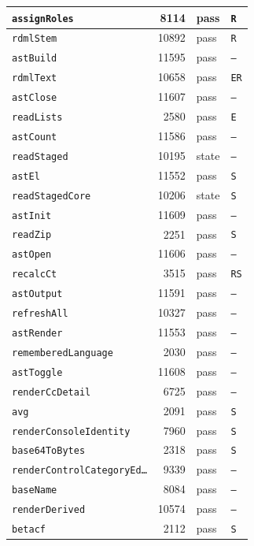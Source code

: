 {\begin{xltabular}{\linewidth}{|l|r|X|X|}
\texttt{assignRoles} & 8114 & pass & \texttt{R} \\ \hline
\texttt{rdmlStem} & 10892 & pass & \texttt{R} \\ \hline
\texttt{astBuild} & 11595 & pass & \texttt{--} \\ \hline
\texttt{rdmlText} & 10658 & pass & \texttt{ER} \\ \hline
\texttt{astClose} & 11607 & pass & \texttt{--} \\ \hline
\texttt{readLists} & 2580 & pass & \texttt{E} \\ \hline
\texttt{astCount} & 11586 & pass & \texttt{--} \\ \hline
\texttt{readStaged} & 10195 & state & \texttt{--} \\ \hline
\texttt{astEl} & 11552 & pass & \texttt{S} \\ \hline
\texttt{readStagedCore} & 10206 & state & \texttt{S} \\ \hline
\texttt{astInit} & 11609 & pass & \texttt{--} \\ \hline
\texttt{readZip} & 2251 & pass & \texttt{S} \\ \hline
\texttt{astOpen} & 11606 & pass & \texttt{--} \\ \hline
\texttt{recalcCt} & 3515 & pass & \texttt{RS} \\ \hline
\texttt{astOutput} & 11591 & pass & \texttt{--} \\ \hline
\texttt{refreshAll} & 10327 & pass & \texttt{--} \\ \hline
\texttt{astRender} & 11553 & pass & \texttt{--} \\ \hline
\texttt{rememberedLanguage} & 2030 & pass & \texttt{--} \\ \hline
\texttt{astToggle} & 11608 & pass & \texttt{--} \\ \hline
\texttt{renderCcDetail} & 6725 & pass & \texttt{--} \\ \hline
\texttt{avg} & 2091 & pass & \texttt{S} \\ \hline
\texttt{renderConsoleIdentity} & 7960 & pass & \texttt{S} \\ \hline
\texttt{base64ToBytes} & 2318 & pass & \texttt{S} \\ \hline
\texttt{renderControlCategoryEd…} & 9339 & pass & \texttt{--} \\ \hline
\texttt{baseName} & 8084 & pass & \texttt{--} \\ \hline
\texttt{renderDerived} & 10574 & pass & \texttt{--} \\ \hline
\texttt{betacf} & 2112 & pass & \texttt{S} \\ \hline

\end{xltabular}}
